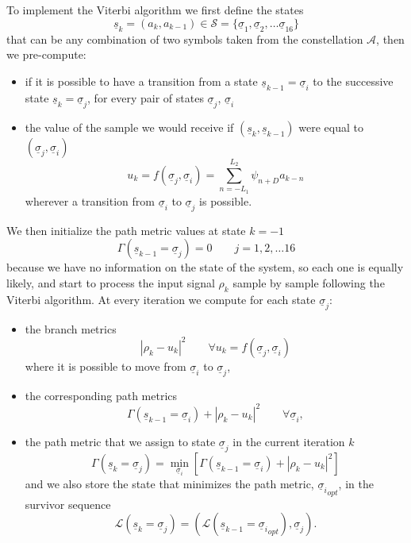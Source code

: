 \documentclass[a4paper,oneside]{article}
\renewcommand{\vec}[1]{\underline{#1}}
\newcommand{\abs}[1]{\left|#1\right|}
\newcommand{\vsigma}[0]{\vec{\sigma}}
\begin{document}
To implement the Viterbi algorithm we first define the states
\begin{equation}
  \vec{s}_k = (a_k,a_{k-1}) \in \mathcal{S} = \{ \vec{\sigma}_1, \vec{\sigma}_2, \dots \vec{\sigma}_{16} \}
\end{equation}
that can be any combination of two symbols taken from the
constellation $\mathcal{A}$, then we pre-compute:
\begin{itemize}
  \item if it is possible to have a transition from a state
    $\vec{s}_{k-1} = \vec{\sigma}_i$ to the successive state
    $\vec{s}_{k} = \vec{\sigma}_j$, for every pair of states
    $\vec{\sigma}_j$, $\vec{\sigma}_i$    
\item the value of the sample we would receive if
  $(\vec{s}_k,\vec{s}_{k-1})$ were equal to $(\vsigma_j, \vsigma_i)$
  \begin{equation}
    u_k = f(\vec{\sigma}_j, \vec{\sigma}_i) =
    \sum_{n=-L_1}^{L_2}\psi_{n+D}a_{k-n}
  \end{equation} wherever a transition from $\vec{\sigma}_i$ to $\vec{\sigma}_j$ is
  possible.
\end{itemize}
We then initialize the path metric values at state $k=-1$
\begin{equation}
  \Gamma(\vec{s}_{k-1} = \vec{\sigma}_j) = 0 \qquad j=1,2,\dots16
\end{equation}
because we have no information on the state of the system, so each one
is equally likely, and start to process the input signal $\rho_k$
sample by sample following the Viterbi algorithm. At every iteration
we compute for each state $\vsigma_j$:
\begin{itemize}
\item the branch metrics
  \begin{equation}
    \abs{\rho_k - u_k}^2 \qquad \forall u_k = f(\vsigma_j,\vsigma_i)
  \end{equation}
    where it is possible to move from $\vsigma_i$ to $\vsigma_j$,
  \item the corresponding path metrics
    \begin{equation}
      \Gamma(\vec{s}_{k-1} = \vec{\sigma}_i) + \abs{\rho_k - u_k}^2 \qquad \forall \vsigma_i ,
    \end{equation}
  \item the path metric that we assign to state $\vsigma_j$ in the
    current iteration $k$
    \begin{equation}
      \Gamma(\vec{s}_k = \vec{\sigma}_j) = \min_{\vsigma_i} \left[ \Gamma(\vec{s}_{k-1} = \vec{\sigma}_i) + \abs{\rho_k - u_k}^2 \right]
    \end{equation}
    and we also store the state that minimizes the path metric,
    ${\vsigma_i}_{opt}$, in the survivor sequence
    \begin{equation}
      \mathcal{L}(\vec{s}_k = \vsigma_j) = (\mathcal{L}(\vec{s}_{k-1} = {\vsigma_i}_{opt}), \vsigma_j) .
    \end{equation}
\end{itemize}
\end{document}
